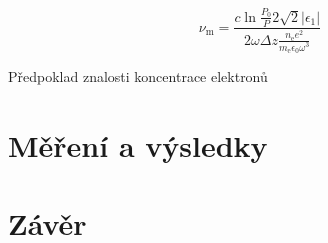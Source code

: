 \documentclass[a4paper,12pt]{article}
\begin{document}
\begin{equation}
	\nu_\text{m} = \frac{c \ln \frac{P_0}{P} 2 \sqrt{2}|\epsilon_1|}{2\omega \Delta z \frac{n_\text{e} e^2}{m_\text{e} \epsilon_0 \omega^3}}
\end{equation}

Předpoklad znalosti koncentrace elektronů

\section{Měření a výsledky}


\section{Závěr}
\end{document}
